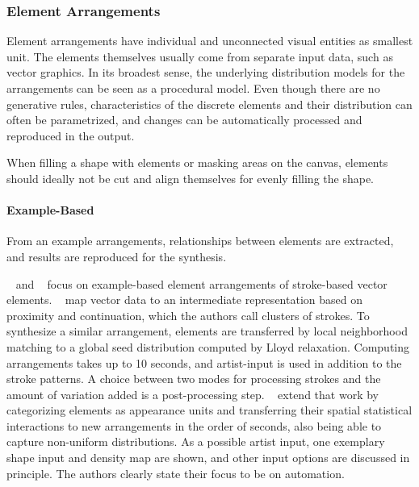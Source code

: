 \subsubsection{Element Arrangements}
\label{subsubsec:analysis_element_arrangements}

Element arrangements have individual and unconnected visual entities as smallest unit. The elements themselves usually come from separate input data, such as vector graphics. In its broadest sense, the underlying distribution models for the arrangements can be seen as a procedural model. Even though there are no generative rules, characteristics of the discrete elements and their distribution can often be parametrized, and changes can be automatically processed and reproduced in the output.

When filling a shape with elements or masking areas on the canvas, elements should ideally not be cut and align themselves for evenly filling the shape.

\paragraph*{Example-Based}
\label{para:analysis_element_arrangements_example}

From an example arrangements, relationships between elements are extracted, and results are reproduced for the synthesis. 

\citeauthor*{barla_2006_spa}~\cite{barla_2006_spa} and \citeauthor*{hurtut_2009_ags}~\cite{hurtut_2009_ags} focus on example-based element arrangements of stroke-based vector elements. \citeauthor*{barla_2006_spa}~\cite{barla_2006_spa} map vector data to an intermediate representation based on proximity and continuation, which the authors call clusters of strokes. To synthesize a similar arrangement, elements are transferred by local neighborhood matching to a global seed distribution computed by Lloyd relaxation. Computing arrangements takes up to 10 seconds, and artist-input is used in addition to the stroke patterns. A choice between two modes for processing strokes and the amount of variation added is a post-processing step. \citeauthor*{hurtut_2009_ags}~\cite{hurtut_2009_ags} extend that work by categorizing elements as appearance units and transferring their spatial statistical interactions to new arrangements in the order of seconds, also being able to capture non-uniform distributions. As a possible artist input, one exemplary shape input and density map are shown, and other input options are discussed in principle. The authors clearly state their focus to be on automation.

